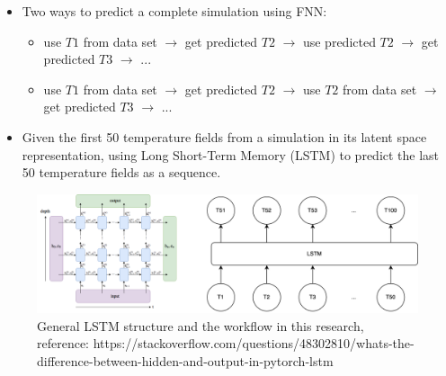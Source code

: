 {\begin{itemize} 
    \item Two ways to predict a complete simulation using FNN:

        \begin{itemize}
            \item use $T1$ from data set $\rightarrow$ get predicted $T2$ $\rightarrow$ use predicted $T2$ $\rightarrow$ get predicted $T3$ $\rightarrow$ ...
            
            \item use $T1$ from data set $\rightarrow$ get predicted $T2$ $\rightarrow$ use $T2$ from data set $\rightarrow$ get predicted $T3$ $\rightarrow$ ...
        \end{itemize}

    \item Given the first 50 temperature fields from a simulation in its latent space representation, using Long Short-Term Memory (LSTM) to predict the last 50 temperature fields as a sequence.
     
\end{itemize}

\begin{figure}[H]
    \centering
    \includegraphics[width=0.8\linewidth]{figures/LSTM_workflow.png}
    \caption{General LSTM structure and the workflow in this research, reference: https://stackoverflow.com/questions/48302810/whats-the-difference-between-hidden-and-output-in-pytorch-lstm}
\end{figure}
}


